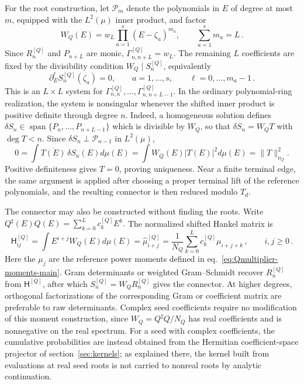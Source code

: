 \documentclass[a4paper,11pt]{article}
\def\dd{d}%
\theoremstyle{definition}
\theoremstyle{remark}
\newcommand{\dd}{\mathrm d}
\newcommand{\cP}{\mathcal P}
\newcommand{\Span}{\operatorname{span}}
\newcommand{\Qsh}{Q^{\sharp}}
\begin{document}
For the root construction, let $\cP_m$ denote the polynomials in $E$ of degree at most $m$, equipped with the $L^2(\mu)$ inner product, and factor
\begin{equation}
   W_Q(E)
   =
   w_L\prod_{a=1}^{s}(E-\zeta_a)^{m_a},
   \qquad
   \sum_{a=1}^{s}m_a=L\,.
   \label{eq:weight-factorization}
\end{equation}
Since $R_n^{[Q]}$ and $P_{n+L}$ are monic,
$\Gamma_{n,n+L}^{[Q]}=w_L$. The remaining $L$ coefficients are fixed by the divisibility condition $W_Q\mid S_n^{[Q]}$, equivalently
\begin{equation}
   \partial_E^\ell S_n^{[Q]}(\zeta_a)=0,
   \qquad
   a=1,\ldots,s,
   \qquad
   \ell=0,\ldots,m_a-1\,.
   \label{eq:root-conditions-main}
\end{equation}
This is an $L\times L$ system for
$\Gamma_{n,n}^{[Q]},\ldots,\Gamma_{n,n+L-1}^{[Q]}$. In the ordinary polynomial-ring realization, the system is nonsingular whenever the shifted inner product is positive definite through degree $n$. Indeed, a homogeneous solution defines
$
   \delta S_n\in\Span\{P_n,\ldots,P_{n+L-1}\}
$
which is divisible by $W_Q$, so that
$\delta S_n=W_QT$ with $\deg T<n$. Since
$\delta S_n\perp\cP_{n-1}$ in $L^2(\mu)$,
\begin{equation}
   0
   =
   \int \overline{T(E)}\,\delta S_n(E)\dd\mu(E)
   =
   \int W_Q(E)|T(E)|^2\dd\mu(E)
   =
   \|T\|_{\nu_Q}^2.
\end{equation}
Positive definiteness gives $T=0$, proving uniqueness. Near a finite terminal edge, the same argument is applied after choosing a proper terminal lift of the reference polynomials, and the resulting connector is then reduced modulo $T_d$.

The connector may also be constructed without finding the roots. Write
$
   \Qsh(E)Q(E)=\sum_{k=0}^{L}c_k^{[Q]}E^k.
$
The normalized shifted Hankel matrix is
\begin{equation}
   \mathsf H_{ij}^{[Q]}
   =
   \int E^{i+j}W_Q(E)\dd\mu(E)
   =
   \widehat\mu_{i+j}^{[Q]}
   =
   \frac{1}{N_Q}
   \sum_{k=0}^{L}c_k^{[Q]}\mu_{i+j+k}\,,
   \qquad i,j\ge0\,.
   \label{eq:shifted-Hankel-moments-main}
\end{equation}
Here the $\mu_j$ are the reference power moments defined in
eq.~\eqref{eq:Qmultiplier-moments-main}. Gram determinants or weighted Gram--Schmidt recover $R_n^{[Q]}$ from $\mathsf H^{[Q]}$, after which
$S_n^{[Q]}=W_QR_n^{[Q]}$ gives the connector. At higher degrees, orthogonal factorizations of the corresponding Gram or coefficient matrix are preferable to raw determinants. Complex seed coefficients require no modification of this moment construction, since $W_Q=\Qsh Q/N_Q$ has real coefficients and is nonnegative on the real spectrum. For a seed with complex coefficients, the cumulative probabilities are instead obtained from the Hermitian coefficient-space projector of section~\ref{sec:kernels}; as explained there, the kernel built from evaluations at real seed roots is not carried to nonreal roots by analytic continuation.
\end{document}
